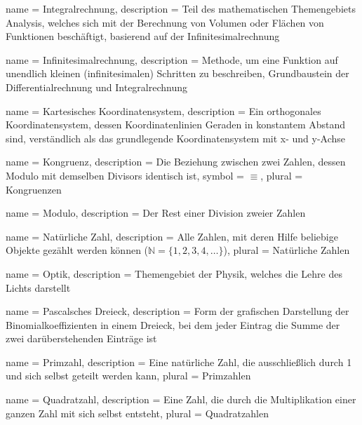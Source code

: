    {
        name = Integralrechnung,
        description = {Teil des mathematischen Themengebiets Analysis, welches sich mit der Berechnung von Volumen oder Flächen von Funktionen beschäftigt, basierend auf der \Gls{Infinitesimalrechnung}}
    }
    
    {
        name = Infinitesimalrechnung,
        description = {Methode, um eine Funktion auf unendlich kleinen (infinitesimalen) Schritten zu beschreiben, Grundbaustein der \Gls{Differentialrechnung} und \Gls{Integralrechnung}}
    }
    
    {
        name = Kartesisches Koordinatensystem,
        description = {Ein orthogonales Koordinatensystem, dessen Koordinatenlinien Geraden in konstantem Abstand sind, verständlich als das grundlegende Koordinatensystem mit x- und y-Achse}
    }
    
    {
        name = Kongruenz,
        description = {Die Beziehung zwischen zwei Zahlen, dessen \Gls{Modulo} mit demselben Divisors identisch ist},
        symbol = {\ensuremath{\equiv}},
        plural = {Kongruenzen}
    }
    
    {
        name = Modulo,
        description = {Der Rest einer Division zweier Zahlen}
    }
    
    {
        name = Natürliche Zahl,
        description = {Alle Zahlen, mit deren Hilfe beliebige Objekte gezählt werden können ($\mathbb{N} = \{ 1,2,3,4, \dots \}$)},
        plural = {Natürliche Zahlen}
    }
    
    {
        name = Optik,
        description = {Themengebiet der Physik, welches die Lehre des Lichts darstellt}
    }
    
    {
        name = Pascalsches Dreieck,
        description = {Form der grafischen Darstellung der Binomialkoeffizienten in einem Dreieck, bei dem jeder Eintrag die Summe der zwei darüberstehenden Einträge ist}
    }
    
    {
        name = Primzahl,
        description = {Eine natürliche Zahl, die ausschließlich durch 1 und sich selbst geteilt werden kann},
        plural = {Primzahlen}
    }
    
    {
        name = Quadratzahl,
        description = {Eine Zahl, die durch die Multiplikation einer ganzen Zahl mit sich selbst entsteht},
        plural = {Quadratzahlen}
    }
    
